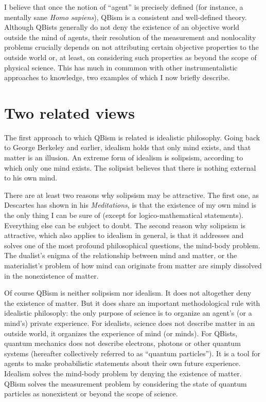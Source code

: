 \documentclass[12pt]{article}
\begin{document}
I believe that once the notion of
``agent'' is precisely defined
(for instance, a mentally sane
\emph{Homo sapiens}), QBism is a
consistent and well-defined theory. Although
QBists generally do not deny the existence
of an objective world outside the mind
of agents, their resolution of the
measurement and nonlocality problems
crucially depends on not attributing
certain objective properties to the outside
world or, at least, on considering such
properties as beyond the scope of
physical science.  This has much in
commmon with other instrumentalistic
approaches to knowledge, two examples
of which I now briefly describe.
%
\section{Two related views\label{S3}}
%
The first approach to which QBism
is related is idealistic philosophy.
Going back to George Berkeley and
earlier, idealism holds that only
mind exists, and that matter is an
illusion.  An extreme form of idealism
is solipsism, according to which only
one mind exists.  The solipsist believes
that there is nothing external to his
own mind.

There are at least two reasons why solipsism
may be attractive.  The first one, as
Descartes has shown in his \emph{Meditations},
is that the existence of my own mind is the
only thing I can be sure of (except for
logico-mathematical statements).  Everything
else can be subject to doubt.  The second
reason why solipsism is attractive, which
also applies to idealism in general, is that
it addresses and solves one of the most profound
philosophical questions, the mind-body
problem.  The dualist's enigma of the
relationship between mind and matter, or
the materialist's problem of how mind can
originate from matter are simply dissolved
in the nonexistence of matter.

Of course QBism is neither solipsism nor
idealism.  It does not altogether deny
the existence of matter.  But it does share
an important methodological rule with
idealistic philosoply: the only purpose
of science is to organize an agent's
(or a mind's) private experience.
For idealists, science does not describe
matter in an outside world, it organizes
the experience of mind (or minds).  For
QBists, quantum mechanics does not describe
electrons, photons or other quantum systems
(hereafter collectively referred to as
``quantum particles'').  It is a tool for
agents to make probabilistic statements
about their own future experience.
Idealism solves the mind-body problem
by denying the existence of matter.
QBism solves the measurement problem
by considering the state of quantum
particles as nonexistent or beyond the
scope of science.
\end{document}
